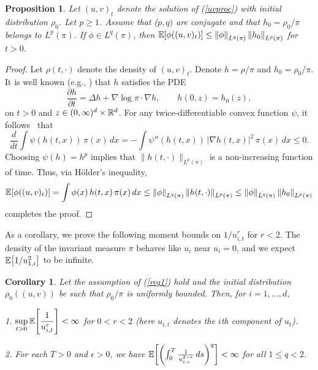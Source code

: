 \documentclass[11pt, twoside]{report}
\newtheorem{corollary}[theorem]{Corollary}
\newtheorem{proposition}[theorem]{Proposition}
\begin{document}
\begin{proposition}\label{l1}Let $(u,v)_t$ denote the solution of (\ref{uvproc}) with initial distribution $\rho_0$. Let $p\geq 1$. Assume that ($p,q)$ are conjugate and that  $h_0=\rho_0/\pi$ belongs to $L^p(\pi)$. If $\phi \in L^q(\pi)$, then $\mean{ \phi((u,v)_t)}\le \norm{\phi}_{L^q(\pi)}\, \norm{h_0}_{L^p(\pi)}$ for $t>0$.
\end{proposition}
%
\begin{proof} Let $\rho(t,\cdot)$ denote the density of $(u,v)_t$. Denote $h=\rho/\pi$ and $h_0=\rho_0/\pi$. It is well known (e.g., \cite{Markowich2004-dw}) that $h$ satisfies the PDE
\[
\frac{\partial h}{\partial t}=\Delta h + \nabla \log \pi\cdot \nabla h,\qquad h(0,z)=h_0(z),
\]
on $t>0$ and $z\in(0,\infty)^d\times \mathbb{R}^d$. For any twice-differentiable convex function $\psi$, it follows~\cite[Eq.~9]{Markowich2004-dw}   that
\[
\frac{d}{dt} \int \psi(h(t,x))\, \pi(x)\,dx=-\int \psi''(h(t,x))\,|\nabla h(t,x)|^2\,\pi(x)\,dx\le 0.\]
Choosing $\psi(h)=h^p$ implies that $\|h(t,\cdot)\|_{L^p(\pi)}$ is a non-increasing function of time.
Thus, via H\"{o}lder's inequality,
 \begin{align*}
     \mean{\phi((u,v)_t)}
 =\int \phi(x)\,h(t,x)\, \pi(x)\, dx
 \le \norm{\phi}_{L^{q}(\pi)} \, \norm{h(t,\cdot)}_{L^p(\pi)} \le \norm{\phi}_{L^{q}(\pi)} \, \norm{h_0}_{L^p(\pi)}
 \end{align*}
 completes the proof.
\end{proof}
As a corollary, we prove the following moment bounds on $1/u_{i,t}^r$ for $r<2$. The density of the invariant measure $\pi$ behaves like $u_i$ near $u_i=0$, and we expect $\mathbb{E}\bp{1/u_{1,i}^2}$ to be infinite. 
\begin{corollary}\label{cor} Let the assumption of (\ref{reg1}) hold and the initial distribution $\rho_0((u,v))$ be such that $\rho_0/\pi$ is uniformly bounded.
Then, for $i=1,\dots,d$,

1. $\displaystyle\sup_{t>0}\mathbb{E} \bp{\frac 1{u_{i,t}^r}}<\infty$ for $0<r<2$ (here $u_{i,t}$ denotes the $i$th component of $u_t$).\vspace{1ex}

2. For each $T>0$ and $\epsilon>0$, we have
 $\mean{\pp{\int_0^T \frac{1}{u_{i,s}^{2-\epsilon}}\,ds}^q} <\infty $ for all $1 \le q < 2$.
  
\end{corollary}
\end{document}
